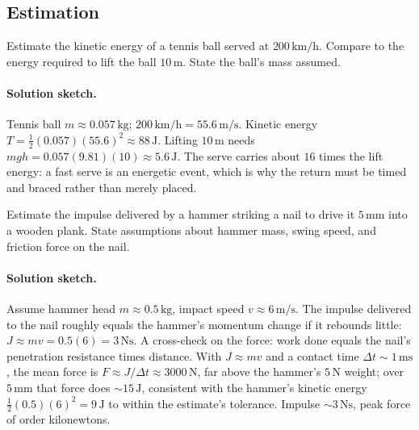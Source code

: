 \subsection*{Estimation}

\begin{exercise}
Estimate the kinetic energy of a tennis ball served at $200\,\si{
\kilo\meter\per\hour}$. Compare to the energy required to lift the
ball $10\,\si{\meter}$. State the ball's mass assumed.
\paragraph{Solution sketch.} Tennis ball $m\approx 0.057\,\si{
\kilogram}$; $200\,\si{\kilo\meter\per\hour}=55.6\,\si{\meter\per
\second}$. Kinetic energy $T=\tfrac{1}{2}(0.057)(55.6)^{2}\approx
88\,\si{\joule}$. Lifting $10\,\si{\meter}$ needs $mgh=0.057(9.81)(10)
\approx 5.6\,\si{\joule}$. The serve carries about $16$ times the
lift energy: a fast serve is an energetic event, which is why the
return must be timed and braced rather than merely placed.
\end{exercise}

\begin{exercise}
Estimate the impulse delivered by a hammer striking a nail to drive
it $5\,\si{\milli\meter}$ into a wooden plank. State assumptions about
hammer mass, swing speed, and friction force on the nail.
\paragraph{Solution sketch.} Assume hammer head $m\approx 0.5\,\si{
\kilogram}$, impact speed $v\approx 6\,\si{\meter\per\second}$. The
impulse delivered to the nail roughly equals the hammer's momentum
change if it rebounds little: $J\approx mv=0.5(6)=3\,\si{\newton
\second}$. A cross-check on the force: work done equals the nail's
penetration resistance times distance. With $J\approx mv$ and a
contact time $\Delta t\sim 1\,\si{\milli\second}$, the mean force is
$F\approx J/\Delta t\approx 3000\,\si{\newton}$, far above the
hammer's $5\,\si{\newton}$ weight; over $5\,\si{\milli\meter}$ that
force does $\sim 15\,\si{\joule}$, consistent with the hammer's
kinetic energy $\tfrac{1}{2}(0.5)(6)^{2}=9\,\si{\joule}$ to within the
estimate's tolerance. Impulse $\sim 3\,\si{\newton\second}$, peak
force of order kilonewtons.
\end{exercise}

